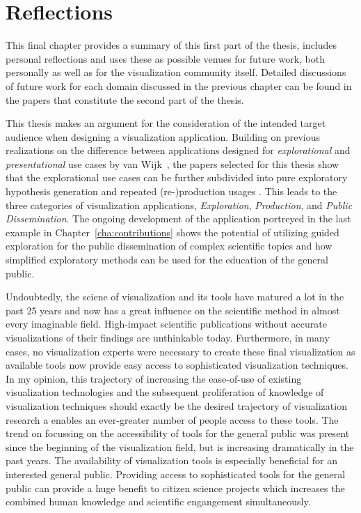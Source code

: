 \chapter{Reflections} \label{cha:reflections}

This final chapter provides a summary of this first part of the thesis, includes personal reflections and uses these as possible venues for future work, both personally as well as for the visualization community itself.  Detailed discussions of future work for each domain discussed in the previous chapter can be found in the papers that constitute the second part of the thesis.

This thesis makes an argument for the consideration of the intended target audience when designing a visualization application.  Building on previous realizations on the difference between applications designed for \emph{explorational} and \emph{presentational} use cases by van Wijk~\cite{van2005value}, the papers selected for this thesis show that the explorational use cases can be further subdivided into pure exploratory hypothesis generation and repeated (re-)production usages .  This leads to the three categories of visualization applications, \emph{Exploration}, \emph{Production}, and \emph{Public Dissemination}.  The ongoing development of the application portreyed in the last example in Chapter~\ref{cha:contributions} shows the potential of utilizing guided exploration for the public dissemination of complex scientific topics and how simplified exploratory methods can be used for the education of the general public.

Undoubtedly, the sciene of visualization and its tools have matured a lot in the past 25 years and now has a great influence on the scientific method in almost every imaginable field.  High-impact scientific publications without accurate visualizations of their findings are unthinkable today.  Furthermore, in many cases, no visualization experts were necessary to create these final visualization as available tools now provide easy access to sophisticated visualization techniques.  In my opinion, this trajectory of increasing the ease-of-use of existing visualization technologies and the subsequent proliferation of knowledge of visualization techniques should exactly be the desired trajectory of visualization research a enables an ever-greater number of people access to these tools.  The trend on focussing on the accessibility of tools for the general public was present since the beginning of the visualization field, but is increasing dramatically in the past years.  The availability of visualization tools is especially beneficial for an interested general public.  Providing access to sophisticated tools for the general public can provide a huge benefit to citizen science projects which increases the combined human knowledge and scientific engangement simultaneously.

